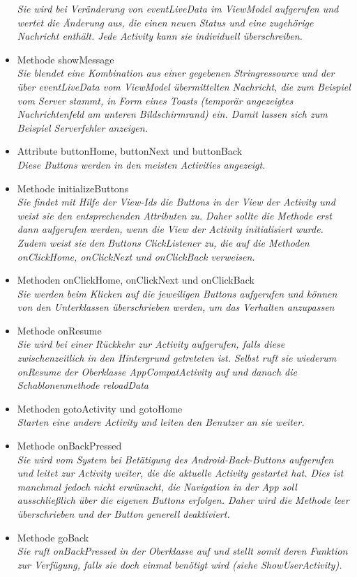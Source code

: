 \documentclass[a4paper]{scrreprt}
\begin{document}
\begin{itemize}
\textit{Sie wird bei Veränderung von eventLiveData im ViewModel aufgerufen und wertet die Änderung aus, die einen neuen Status und eine zugehörige Nachricht enthält. Jede Activity kann sie individuell überschreiben.}
\item Methode showMessage\\
\textit{Sie blendet eine Kombination aus einer gegebenen Stringressource und der über eventLiveData vom ViewModel übermittelten Nachricht, die zum Beispiel vom Server stammt, in Form eines Toasts (temporär angezeigtes Nachrichtenfeld am unteren Bildschirmrand) ein. Damit lassen sich zum Beispiel Serverfehler anzeigen.}
\item Attribute buttonHome, buttonNext und buttonBack\\
\textit{Diese Buttons werden in den meisten Activities angezeigt.}
\item Methode initializeButtons\\
\textit{Sie findet mit Hilfe der View-Ids die Buttons in der View der Activity und weist sie den entsprechenden Attributen zu. Daher sollte die Methode erst dann aufgerufen werden, wenn die View der Activity initialisiert wurde. Zudem weist sie den Buttons ClickListener zu, die auf die Methoden onClickHome, onClickNext und onClickBack verweisen.}
\item Methoden onClickHome, onClickNext und onClickBack\\
\textit{Sie werden beim Klicken auf die jeweiligen Buttons aufgerufen und können von den Unterklassen überschrieben werden, um das Verhalten anzupassen}
\item Methode onResume\\
\textit{Sie wird bei einer Rückkehr zur Activity aufgerufen, falls diese zwischenzeitlich in den Hintergrund getreteten ist. Selbst ruft sie wiederum onResume der Oberklasse AppCompatActivity auf und danach die Schablonenmethode reloadData}
\item Methoden gotoActivity und gotoHome\\
\textit{Starten eine andere Activity und leiten den Benutzer an sie weiter.}
\item Methode onBackPressed\\
\textit{Sie wird vom System bei Betätigung des Android-Back-Buttons aufgerufen und leitet zur Activity weiter, die die aktuelle Activity gestartet hat. Dies ist manchmal jedoch nicht erwünscht, die Navigation in der App soll ausschließlich über die eigenen Buttons erfolgen. Daher wird die Methode leer überschrieben und der Button generell deaktiviert.}
\item Methode goBack\\
\textit{Sie ruft onBackPressed in der Oberklasse auf und stellt somit deren Funktion zur Verfügung, falls sie doch einmal benötigt wird (siehe ShowUserActivity).}
\end{itemize}
\end{document}
